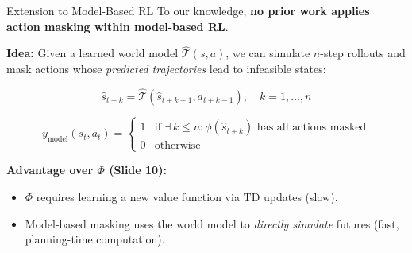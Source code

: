 \documentclass[11pt,aspectratio=169]{beamer}
\begin{document}
\begin{frame}{Extension to Model-Based RL}
    To our knowledge, \textbf{no prior work applies action masking within model-based RL}.

    \vspace{0.3cm}
    \textbf{Idea:} Given a learned world model $\hat{\mathcal{T}}(s, a)$, we can simulate $n$-step rollouts and mask actions whose \textit{predicted trajectories} lead to infeasible states:

    \begin{equation}
        \hat{s}_{t+k} = \hat{\mathcal{T}}(\hat{s}_{t+k-1}, a_{t+k-1}), \quad k = 1, \ldots, n
    \end{equation}

    \begin{equation}
        y_{\text{model}}(s_t, a_t) =
        \begin{cases}
            1 & \text{if } \exists\, k \leq n : \phi(\hat{s}_{t+k}) \text{ has all actions masked} \\
            0 & \text{otherwise}
        \end{cases}
    \end{equation}

    \textbf{Advantage over $\Phi$ (Slide 10):}
    \begin{itemize}
        \item $\Phi$ requires learning a new value function via TD updates (slow).
        \item Model-based masking uses the world model to \textit{directly simulate} futures (fast, planning-time computation).
    \end{itemize}
\end{frame}
\end{document}
